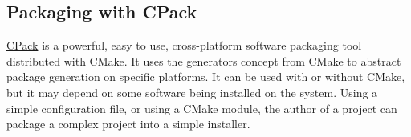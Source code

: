 \subsection{Packaging with CPack}

\href{https://cmake.org/cmake/help/book/mastering-cmake/chapter/Packaging\%20With\%20CPack.html}{CPack} is a powerful, easy to use, 
cross-platform software packaging tool distributed with CMake. 
It uses the generators concept from CMake to abstract package generation on specific platforms. 
It can be used with or without CMake, but it may depend on some software being installed on the system. 
Using a simple configuration file, or using a CMake module, the author of a project can package a complex project into a simple installer. 
